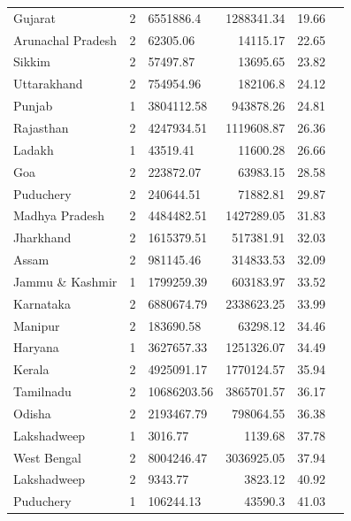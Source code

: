 \documentclass{article}
\begin{document}
\begin{table}[h!]
{\begin{tabular}{|l|l|l|r|r|r|}
			Gujarat                        & 2  & 6551886.4  & 1288341.34 & 19.66 \\
			Arunachal Pradesh             & 2  & 62305.06   & 14115.17  & 22.65 \\
			Sikkim                        & 2  & 57497.87   & 13695.65  & 23.82 \\
			Uttarakhand                   & 2  & 754954.96  & 182106.8  & 24.12 \\
			Punjab                        & 1  & 3804112.58 & 943878.26 & 24.81 \\
			Rajasthan                     & 2  & 4247934.51 & 1119608.87 & 26.36 \\
			Ladakh                        & 1  & 43519.41   & 11600.28  & 26.66 \\
			Goa                           & 2  & 223872.07  & 63983.15  & 28.58 \\
			Puduchery                     & 2  & 240644.51  & 71882.81  & 29.87 \\
			Madhya Pradesh                & 2  & 4484482.51 & 1427289.05 & 31.83 \\
			Jharkhand                     & 2  & 1615379.51 & 517381.91 & 32.03 \\
			Assam                         & 2  & 981145.46  & 314833.53 & 32.09 \\
			Jammu \& Kashmir              & 1  & 1799259.39 & 603183.97 & 33.52 \\
			Karnataka                     & 2  & 6880674.79 & 2338623.25 & 33.99 \\
			Manipur                       & 2  & 183690.58  & 63298.12  & 34.46 \\
			Haryana                       & 1  & 3627657.33 & 1251326.07 & 34.49 \\
			Kerala                        & 2  & 4925091.17 & 1770124.57 & 35.94 \\
			Tamilnadu                     & 2  & 10686203.56 & 3865701.57 & 36.17 \\
			Odisha                        & 2  & 2193467.79 & 798064.55 & 36.38 \\
			Lakshadweep                   & 1  & 3016.77    & 1139.68   & 37.78 \\
			West Bengal                   & 2  & 8004246.47 & 3036925.05 & 37.94 \\
			Lakshadweep                   & 2  & 9343.77    & 3823.12   & 40.92 \\
			Puduchery                     & 1  & 106244.13  & 43590.3   & 41.03 \\

\end{tabular}}
\end{table}
\end{document}
